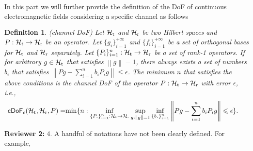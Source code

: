 \documentclass[a4paper,12pt]{article}
\newtheorem{definition}{Definition}
\begin{document}
\begin{framed}
{    	\quad In this part we will further provide the definition of the DoF of continuous electromagnetic fields considering a specific channel as follows
    }
    \begin{definition}
    	\label{def_cDoF}
    	(channel DoF) Let $\mathcal{H}_{\rm t}$ and $\mathcal{H}_{\rm r}$ be two Hilbert spaces and $P:\mathcal{H}_{\rm t} \rightarrow \mathcal{H}_{\rm r}$ be an operator. Let $\{g_i\}_{i=1}^{+\infty}$ and $\{f_i\}_{i=1}^{+\infty}$ be a set of orthogonal bases for $\mathcal{H}_{\rm t}$ and $\mathcal{H}_{\rm r}$ separately. Let $\{P_i\}_{i=1}^n: \mathcal{H}_{\rm t} \rightarrow \mathcal{H}_{\rm r}$ be a set of rank-1 operators. 
    	If for arbitrary $g \in \mathcal{H}_{\rm t}$ that satisfies $\left\| g \right\|=1$, there always exists a set of numbers $b_i$ that satisfies $\left\| Pg-\sum_{i=1}^{n} b_iP_ig  \right\| \leqslant \epsilon$. The minimum $n$ that satisfies the above conditions is the channel DoF of the operator $P: \mathcal{H}_{\rm t} \rightarrow \mathcal{H}_{\rm r}$ with error $\epsilon$, i.e., 
    	\begin{equation}
    		\begin{aligned}
    			\mathsf{cDoF}_{\epsilon} (\mathcal{H}_{\rm t},\mathcal{H}_{\rm r},P) =& {\rm min}\{ n: \underset{\{P_i\}_{i=1}^n: \mathcal{H}_{\rm t} \rightarrow \mathcal{H}_{\rm r}}{\rm inf} \sup_{g: \left\| g \right\|=1} \inf_{\{b_i\}_{i=1}^n} \left\| Pg-\sum_{i=1}^{n} b_iP_ig  \right\| \leqslant \epsilon  \}.
    		\end{aligned}
    	\end{equation}
    \end{definition}

\end{framed}

\textbf{Reviewer 2:}
4. A handful of notations have not been clearly defined. For example,
\end{document}
